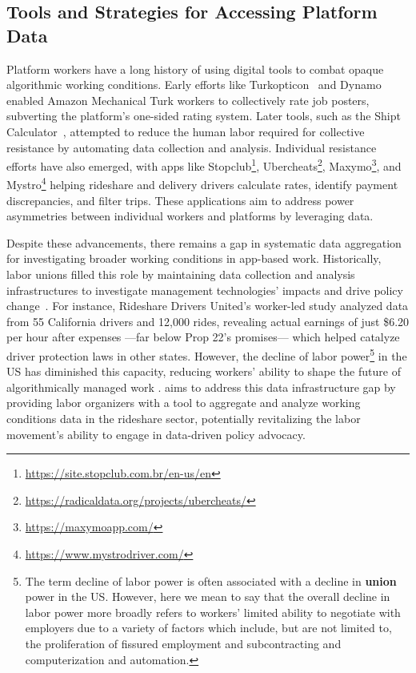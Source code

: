 \subsection{Tools and Strategies for Accessing Platform Data}

Platform workers have a long history of using digital tools to combat opaque algorithmic working conditions. Early efforts like Turkopticon~\cite{irani2013turkopticon} and Dynamo~\cite{salehiWeAreDynamo2015} enabled Amazon Mechanical Turk workers to collectively rate job posters, subverting the platform's one-sided rating system. Later tools, such as the Shipt Calculator~\cite{calacciBargainingBlackBoxDesigning2022}, attempted to reduce the human labor required for collective resistance by automating data collection and analysis. Individual resistance efforts have also emerged, with apps like Stopclub\footnote{\url{https://site.stopclub.com.br/en-us/en}}, Ubercheats\footnote{\url{https://radicaldata.org/projects/ubercheats/}}, Maxymo\footnote{\url{https://maxymoapp.com/}}, and Mystro\footnote{\url{https://www.mystrodriver.com/}} helping rideshare and delivery drivers calculate rates, identify payment discrepancies, and filter trips. These applications aim to address power asymmetries between individual workers and platforms by leveraging data.

Despite these advancements, there remains a gap in systematic data aggregation for investigating broader working conditions in app-based work. Historically, labor unions filled this role by maintaining data collection and analysis infrastructures to investigate management technologies' impacts and drive policy change~\cite{khovanskaya2020}. 
For instance, Rideshare Drivers United's worker-led study \cite{mccullough2022prop} analyzed data from 55 California drivers and 12,000 rides, revealing actual earnings of just \$6.20 per hour after expenses ---far below Prop 22's promises--- which helped catalyze driver protection laws in other states.
However, the decline of labor power\footnote{The term decline of labor power is often associated with a decline in \textbf{union} power in the US. However, here we mean to say that the overall decline in labor power more broadly refers to workers' limited ability to negotiate with employers due to a variety of factors which include, but are not limited to, the proliferation of fissured employment and subcontracting and computerization and automation. } in the US has diminished this capacity, reducing workers' ability to shape the future of algorithmically managed work \cite{kristal2013capitalist,greenbaum1996}. \Sys{} aims to address this data infrastructure gap by providing labor organizers with a tool to aggregate and analyze working conditions data in the rideshare sector, potentially revitalizing the labor movement's ability to engage in data-driven policy advocacy.



